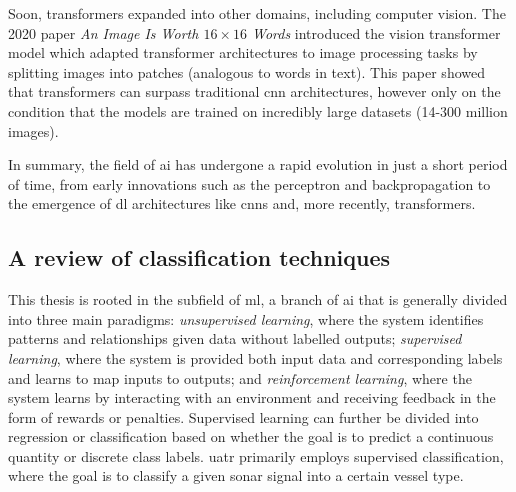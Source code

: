 Soon, transformers expanded into other domains, including computer vision. The 2020 paper \textit{An Image Is Worth $16\times16$ Words} \cite{dosovitskiy_image_2020} introduced the vision transformer model which adapted transformer architectures to image processing tasks by splitting images into patches (analogous to words in text). This paper showed that transformers can surpass traditional \acrshort{cnn} architectures, however only on the condition that the models are trained on incredibly large datasets (14-300 million images).

In summary, the field of \acrlong{ai} has undergone a rapid evolution in just a short period of time, from early innovations such as the perceptron and backpropagation to the emergence of \acrlong{dl} architectures like \acrshort{cnn}s and, more recently, transformers. 

\subsection{A review of classification techniques}

This thesis is rooted in the subfield of \acrlong{ml}, a branch of \acrshort{ai} that is generally divided into three main paradigms: \textit{unsupervised learning}, where the system identifies patterns and relationships given data without labelled outputs; \textit{supervised learning}, where the system is provided both input data and corresponding labels and learns to map inputs to outputs; and \textit{reinforcement learning}, where the system learns by interacting with an environment and receiving feedback in the form of rewards or penalties. Supervised learning can further be divided into regression or classification based on whether the goal is to predict a continuous quantity or discrete class labels. \acrshort{uatr} primarily employs supervised classification, where the goal is to classify a given sonar signal into a certain vessel type.

